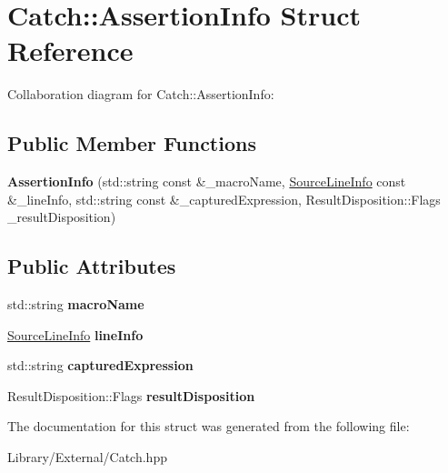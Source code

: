 \hypertarget{struct_catch_1_1_assertion_info}{}\section{Catch\+:\+:Assertion\+Info Struct Reference}
\label{struct_catch_1_1_assertion_info}


Collaboration diagram for Catch\+:\+:Assertion\+Info\+:
\subsection*{Public Member Functions}
\begin{DoxyCompactItemize}
\item 
\hypertarget{struct_catch_1_1_assertion_info_aaf6cc3eebd40391e54d37ed42953c73f}{}{\bfseries Assertion\+Info} (std\+::string const \&\+\_\+macro\+Name, \hyperlink{struct_catch_1_1_source_line_info}{Source\+Line\+Info} const \&\+\_\+line\+Info, std\+::string const \&\+\_\+captured\+Expression, Result\+Disposition\+::\+Flags \+\_\+result\+Disposition)\label{struct_catch_1_1_assertion_info_aaf6cc3eebd40391e54d37ed42953c73f}

\end{DoxyCompactItemize}
\subsection*{Public Attributes}
\begin{DoxyCompactItemize}
\item 
\hypertarget{struct_catch_1_1_assertion_info_ac2e59e8c89e00eb3390768f50d540b18}{}std\+::string {\bfseries macro\+Name}\label{struct_catch_1_1_assertion_info_ac2e59e8c89e00eb3390768f50d540b18}

\item 
\hypertarget{struct_catch_1_1_assertion_info_a17bdbb404ba12658034f833be2f4c3e7}{}\hyperlink{struct_catch_1_1_source_line_info}{Source\+Line\+Info} {\bfseries line\+Info}\label{struct_catch_1_1_assertion_info_a17bdbb404ba12658034f833be2f4c3e7}

\item 
\hypertarget{struct_catch_1_1_assertion_info_af7c1d3cbfa346e9a303030fa0ef0cb54}{}std\+::string {\bfseries captured\+Expression}\label{struct_catch_1_1_assertion_info_af7c1d3cbfa346e9a303030fa0ef0cb54}

\item 
\hypertarget{struct_catch_1_1_assertion_info_a60353b3632ab2f827162f2b2d6911073}{}Result\+Disposition\+::\+Flags {\bfseries result\+Disposition}\label{struct_catch_1_1_assertion_info_a60353b3632ab2f827162f2b2d6911073}

\end{DoxyCompactItemize}


The documentation for this struct was generated from the following file\+:\begin{DoxyCompactItemize}
\item 
Library/\+External/Catch.\+hpp\end{DoxyCompactItemize}
